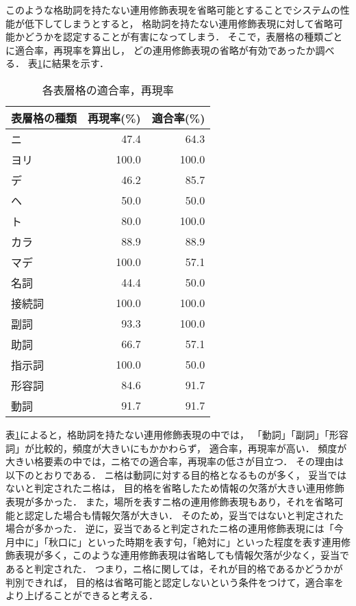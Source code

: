 このような格助詞を持たない連用修飾表現を省略可能とすることでシステムの性能が低下してしまうとすると，
格助詞を持たない連用修飾表現に対して省略可能かどうかを認定することが有害になってしまう．
そこで，表層格の種類ごとに適合率，再現率を算出し，
どの連用修飾表現の省略が有効であったか調べる．
表\ref{result_pre}に結果を示す．
\begin{table}[bt]
\begin{center}
\caption{各表層格の適合率，再現率} \label{result_pre}
\begin{tabular}{l|r|r}
\hline
表層格の種類 & 再現率(\%) & 適合率(\%) \\
\hline \hline
ニ & 47.4 & 64.3 \\
ヨリ & 100.0 & 100.0 \\
デ & 46.2 & 85.7 \\
ヘ & 50.0 & 50.0 \\
ト & 80.0 & 100.0 \\
カラ & 88.9 & 88.9 \\
マデ & 100.0 & 57.1 \\ \hline
名詞 & 44.4 & 50.0 \\
接続詞 & 100.0 & 100.0 \\
副詞 & 93.3 & 100.0 \\
助詞 & 66.7 & 57.1 \\
指示詞 & 100.0 & 50.0 \\
形容詞 & 84.6 & 91.7 \\
動詞 & 91.7 & 91.7 \\
\hline
\end{tabular}
\end{center}
\end{table}
表\ref{result_pre}によると，格助詞を持たない連用修飾表現の中では，
「動詞」「副詞」「形容詞」が比較的，頻度が大きいにもかかわらず，
適合率，再現率が高い．
頻度が大きい格要素の中では，ニ格での適合率，再現率の低さが目立つ．
その理由は以下のとおりである．
ニ格は動詞に対する目的格となるものが多く，
妥当ではないと判定されたニ格は，
目的格を省略したため情報の欠落が大きい連用修飾表現が多かった．
また，場所を表すニ格の連用修飾表現もあり，それを省略可能と認定した場合も情報欠落が大きい．
そのため，妥当ではないと判定された場合が多かった．
逆に，妥当であると判定されたニ格の連用修飾表現には「今月中に」「秋口に」といった時期を表す句，「絶対に」といった程度を表す連用修飾表現が多く，このような連用修飾表現は省略しても情報欠落が少なく，妥当であると判定された．
つまり，ニ格に関しては，それが目的格であるかどうかが判別できれば，
目的格は省略可能と認定しないという条件をつけて，適合率を
より上げることができると考える．

